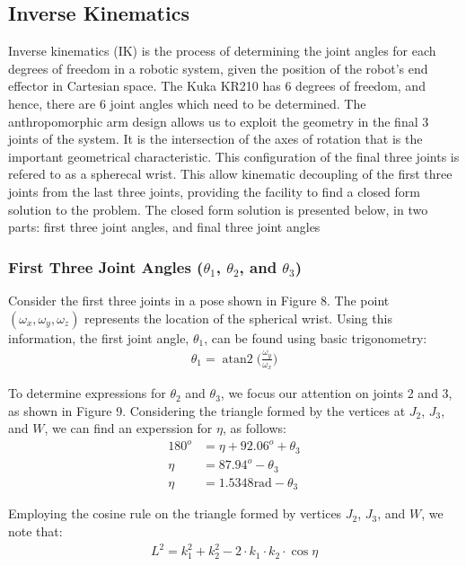\documentclass[a4paper]{article}
\DeclareMathOperator{\atantwo}{atan2}
\begin{document}
\newpage

\subsection{Inverse Kinematics}
Inverse kinematics (IK) is the process of determining the joint angles for each degrees of freedom in a robotic system, given the position of the robot's end effector in Cartesian space. The Kuka KR210 has 6 degrees of freedom, and hence, there are 6 joint angles which need to be determined. The anthropomorphic arm design allows us to exploit the geometry in the final 3 joints of the system. It is the intersection of the axes of rotation that is the important geometrical characteristic. This configuration of the final three joints is refered to as a spherecal wrist. This allow kinematic decoupling of the first three joints from the last three joints, providing the facility to find a closed form solution to the problem. The closed form solution is presented below, in two parts: first three joint angles, and final three joint angles

\subsubsection{First Three Joint Angles ($\theta_1$, $\theta_2$, and $\theta_3$)}
Consider the first three joints in a pose shown in Figure 8. The point $(\omega_x, \omega_y, \omega_z)$ represents the location of the spherical wrist. Using this information, the first joint angle, $\theta_1$, can be found using basic trigonometry:
\begin{align}
\theta_1 = \atantwo \bigg( \frac{\omega_y}{\omega_x} \bigg)
\end{align}

To determine expressions for $\theta_2$ and $\theta_3$, we focus our attention on joints 2 and 3, as shown in Figure 9. Considering the triangle formed by the vertices at $J_2$, $J_3$, and $W$, we can find an experssion for $\eta$, as follows:
\begin{align}
180^o &= \eta + 92.06^o + \theta_3 \nonumber\\
\eta &= 87.94^o - \theta_3 \nonumber\\
\eta &= 1.5348 \si{\radian} - \theta_3
\end{align}

Employing the cosine rule on the triangle formed by vertices $J_2$, $J_3$, and $W$, we note that:
\begin{align*}
L^2 = k_1^2 + k_2^2 - 2 \cdot k_1 \cdot k_2 \cdot \cos \eta
\end{align*}
\end{document}
